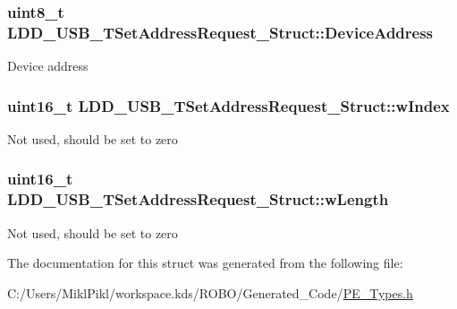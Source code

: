 \subsubsection[{Device\+Address}]{\setlength{\rightskip}{0pt plus 5cm}uint8\+\_\+t L\+D\+D\+\_\+\+U\+S\+B\+\_\+\+T\+Set\+Address\+Request\+\_\+\+Struct\+::\+Device\+Address}\label{struct_l_d_d___u_s_b___t_set_address_request___struct_ac55059f77c050ba97d5f0d9b2b3a52c9}
Device address \hypertarget{struct_l_d_d___u_s_b___t_set_address_request___struct_ab6a26adfbbc2e164679a4d7dcf5c99d0}{}
\subsubsection[{w\+Index}]{\setlength{\rightskip}{0pt plus 5cm}uint16\+\_\+t L\+D\+D\+\_\+\+U\+S\+B\+\_\+\+T\+Set\+Address\+Request\+\_\+\+Struct\+::w\+Index}\label{struct_l_d_d___u_s_b___t_set_address_request___struct_ab6a26adfbbc2e164679a4d7dcf5c99d0}
Not used, should be set to zero \hypertarget{struct_l_d_d___u_s_b___t_set_address_request___struct_adff24e6d3ec27fce1f59693aa215deda}{}
\subsubsection[{w\+Length}]{\setlength{\rightskip}{0pt plus 5cm}uint16\+\_\+t L\+D\+D\+\_\+\+U\+S\+B\+\_\+\+T\+Set\+Address\+Request\+\_\+\+Struct\+::w\+Length}\label{struct_l_d_d___u_s_b___t_set_address_request___struct_adff24e6d3ec27fce1f59693aa215deda}
Not used, should be set to zero 

The documentation for this struct was generated from the following file\+:\begin{DoxyCompactItemize}
\item 
C\+:/\+Users/\+Mikl\+Pikl/workspace.\+kds/\+R\+O\+B\+O/\+Generated\+\_\+\+Code/\hyperlink{_p_e___types_8h}{P\+E\+\_\+\+Types.\+h}\end{DoxyCompactItemize}
